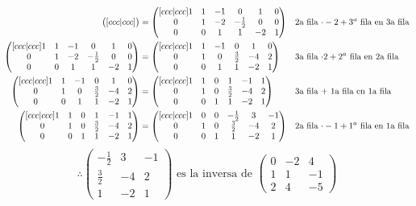 \documentclass[letterpaper]{article}
\renewcommand{\*}{\cdot}
\theoremstyle{definition}
\begin{document}
\begin{align*}
\begin{pmatrix}[ccc|ccc]
		\end{pmatrix} & = \begin{pmatrix}[ccc|ccc]
		1 & 1 & -1 & 0 & 1 & 0\\
		0 & 1 & -2 & -\frac{1}{2} & 0 & 0\\
		0 & 0 & 1 & 1 & -2 & 1
		\end{pmatrix} && \text{2a fila $ \* -2  + 3^a$ fila en 3a fila}\\
		\begin{pmatrix}[ccc|ccc]
		1 & 1 & -1 & 0 & 1 & 0\\
		0 & 1 & -2 & -\frac{1}{2} & 0 & 0\\
		0 & 0 & 1 & 1 & -2 & 1
		\end{pmatrix} & = \begin{pmatrix}[ccc|ccc]
		1 & 1 & -1 & 0 & 1 & 0\\
		0 & 1 & 0 & \frac{3}{2} & -4 & 2\\
		0 & 0 & 1 & 1 & -2 & 1
		\end{pmatrix} && \text{3a fila $ \* 2 + 2^a$ fila en 2a fila}\\
		\begin{pmatrix}[ccc|ccc]
		1 & 1 & -1 & 0 & 1 & 0\\
		0 & 1 & 0 & \frac{3}{2} & -4 & 2\\
		0 & 0 & 1 & 1 & -2 & 1
		\end{pmatrix} & = \begin{pmatrix}[ccc|ccc]
		1 & 1 & 0 & 1 & -1 & 1\\
		0 & 1 & 0 & \frac{3}{2} & -4 & 2\\
		0 & 0 & 1 & 1 & -2 & 1
		\end{pmatrix} && \text{3a fila + 1a fila en 1a fila}\\
		\begin{pmatrix}[ccc|ccc]
		1 & 1 & 0 & 1 & -1 & 1\\
		0 & 1 & 0 & \frac{3}{2} & -4 & 2\\
		0 & 0 & 1 & 1 & -2 & 1
		\end{pmatrix} & = \begin{pmatrix}[ccc|ccc]
		1 & 0 & 0 & -\frac{1}{2} & 3 & -1\\
		0 & 1 & 0 & \frac{3}{2} & -4 & 2\\
		0 & 0 & 1 & 1 & -2 & 1
		\end{pmatrix} && \text{2a fila $ \* -1  + 1^a $ fila en 1a fila}
	\end{align*}
	\[ \therefore \begin{pmatrix}
	-\frac{1}{2} & 3 & -1\\
	\frac{3}{2} & -4 & 2\\
	1 & -2 & 1
	\end{pmatrix} \text{ es la inversa de } \begin{pmatrix} 0 & -2 & 4 \\ 1 & 1 & -1 \\ 2 & 4 & -5 \end{pmatrix}  \]
\end{document}
